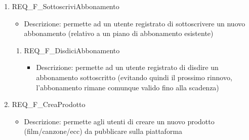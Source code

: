 \begin{enumerate}
	\item REQ\_F\_SottoscriviAbbonamento
		\begin{itemize}	
			\item Descrizione: permette ad un utente registrato di sottoscrivere un nuovo abbonamento (relativo a un piano di abbonamento esistente)
		\end{itemize}
		\begin{enumerate}[label*=\arabic*.]			
		\item REQ\_F\_DisdiciAbbonamento
			\begin{itemize}	
				\item Descrizione: permette ad un utente registrato di disdire un abbonamento sottoscritto (evitando quindi il prossimo rinnovo, l'abbonamento rimane comunque valido fino alla scadenza)
			\end{itemize}
		\end{enumerate}
	
	
	\item REQ\_F\_CreaProdotto
	\begin{itemize}
		\item Descrizione: permette agli utenti di creare un nuovo prodotto (film/canzone/ecc) da pubblicare sulla piattaforma
	\end{itemize}
	\begin{enumerate}[label*=\arabic*.]
		

\end{enumerate}
\end{enumerate}
